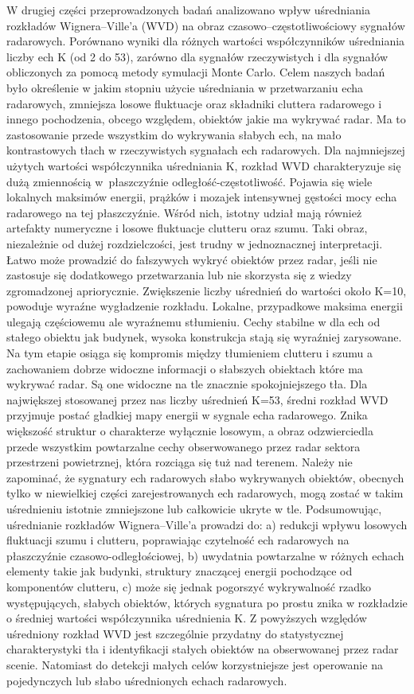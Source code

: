 W drugiej części przeprowadzonych badań analizowano wpływ uśredniania rozkładów Wignera--Ville'a (WVD) na obraz czasowo--częstotliwościowy sygnałów radarowych. Porównano wyniki dla różnych wartości współczynników uśredniania liczby ech K (od 2 do 53), zarówno dla sygnałów rzeczywistych i dla sygnałów obliczonych za pomocą metody symulacji Monte Carlo. Celem naszych badań było określenie w jakim stopniu użycie uśredniania w przetwarzaniu echa radarowych, zmniejsza losowe fluktuacje oraz składniki cluttera radarowego i innego pochodzenia, obcego względem, obiektów jakie ma wykrywać radar. Ma to zastosowanie przede wszystkim do wykrywania słabych ech, na mało kontrastowych tłach w rzeczywistych sygnałach ech radarowych. Dla najmniejszej użytych wartości współczynnika uśredniania K, rozkład WVD charakteryzuje się dużą zmiennością w~płaszczyźnie odległość-częstotliwość. Pojawia się wiele lokalnych maksimów energii, prążków i mozajek intensywnej gęstości mocy echa radarowego na tej płaszczyźnie. Wśród nich, istotny udział mają również artefakty numeryczne i losowe fluktuacje clutteru oraz szumu. Taki obraz, niezależnie od dużej rozdzielczości, jest trudny w jednoznacznej interpretacji. Łatwo może prowadzić do fałszywych wykryć obiektów przez radar, jeśli nie zastosuje się dodatkowego przetwarzania lub nie skorzysta się z wiedzy zgromadzonej apriorycznie.
Zwiększenie liczby uśrednień do wartości około K=10, powoduje wyraźne wygładzenie rozkładu. Lokalne, przypadkowe maksima energii ulegają częściowemu ale wyraźnemu stłumieniu. Cechy stabilne w dla ech od stałego obiektu jak budynek, wysoka konstrukcja stają się wyraźniej zarysowane. Na tym etapie osiąga się kompromis między tłumieniem clutteru i szumu a zachowaniem dobrze widoczne informacji o słabszych obiektach które ma wykrywać radar. Są one widoczne na tle znacznie spokojniejszego tła.
Dla największej stosowanej przez nas liczby uśrednień K=53, średni rozkład WVD przyjmuje postać gładkiej mapy energii w sygnale echa radarowego. Znika większość struktur o charakterze wyłącznie losowym, a obraz odzwierciedla przede wszystkim powtarzalne cechy obserwowanego przez radar sektora przestrzeni powietrznej, która rozciąga się tuż nad terenem. 
Należy nie zapominać, że sygnatury ech radarowych słabo wykrywanych obiektów, obecnych tylko w niewielkiej części zarejestrowanych ech radarowych, mogą zostać w takim uśrednieniu istotnie zmniejszone lub całkowicie ukryte w tle. Podsumowując, uśrednianie rozkładów Wignera--Ville'a prowadzi do:
a) redukcji wpływu losowych fluktuacji szumu i clutteru, poprawiając czytelność ech radarowych na płaszczyźnie czasowo-odległościowej,
b) uwydatnia powtarzalne w różnych echach elementy takie jak budynki, struktury znaczącej energii pochodzące od komponentów clutteru,
c) może się jednak pogorszyć wykrywalność rzadko występujących, słabych obiektów, których sygnatura po prostu znika w rozkładzie o średniej wartości współczynnika uśrednienia K.
Z powyższych względów uśredniony rozkład WVD jest szczególnie przydatny do statystycznej charakterystyki tła i identyfikacji stałych obiektów na obserwowanej przez radar scenie. Natomiast do detekcji małych celów korzystniejsze jest operowanie na pojedynczych lub słabo uśrednionych echach radarowych.

